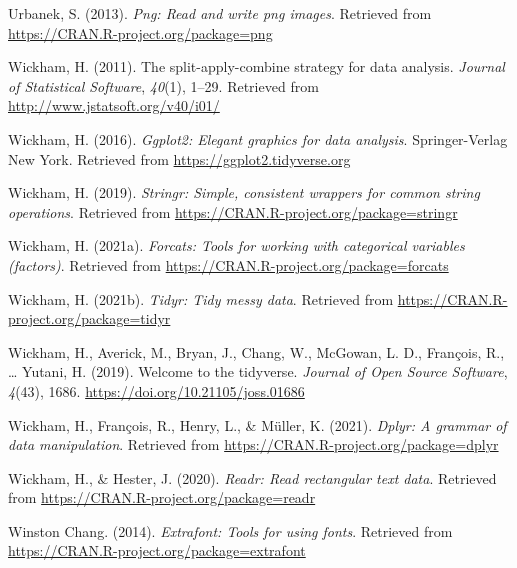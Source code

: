 \documentclass[
  english,
  man,floatsintext]{apa6}
\begin{document}
\leavevmode\hypertarget{ref-R-png}{}%
Urbanek, S. (2013). \emph{Png: Read and write png images}. Retrieved from \url{https://CRAN.R-project.org/package=png}

\leavevmode\hypertarget{ref-R-plyr}{}%
Wickham, H. (2011). The split-apply-combine strategy for data analysis. \emph{Journal of Statistical Software}, \emph{40}(1), 1--29. Retrieved from \url{http://www.jstatsoft.org/v40/i01/}

\leavevmode\hypertarget{ref-R-ggplot2}{}%
Wickham, H. (2016). \emph{Ggplot2: Elegant graphics for data analysis}. Springer-Verlag New York. Retrieved from \url{https://ggplot2.tidyverse.org}

\leavevmode\hypertarget{ref-R-stringr}{}%
Wickham, H. (2019). \emph{Stringr: Simple, consistent wrappers for common string operations}. Retrieved from \url{https://CRAN.R-project.org/package=stringr}

\leavevmode\hypertarget{ref-R-forcats}{}%
Wickham, H. (2021a). \emph{Forcats: Tools for working with categorical variables (factors)}. Retrieved from \url{https://CRAN.R-project.org/package=forcats}

\leavevmode\hypertarget{ref-R-tidyr}{}%
Wickham, H. (2021b). \emph{Tidyr: Tidy messy data}. Retrieved from \url{https://CRAN.R-project.org/package=tidyr}

\leavevmode\hypertarget{ref-R-tidyverse}{}%
Wickham, H., Averick, M., Bryan, J., Chang, W., McGowan, L. D., François, R., \ldots{} Yutani, H. (2019). Welcome to the tidyverse. \emph{Journal of Open Source Software}, \emph{4}(43), 1686. \url{https://doi.org/10.21105/joss.01686}

\leavevmode\hypertarget{ref-R-dplyr}{}%
Wickham, H., François, R., Henry, L., \& Müller, K. (2021). \emph{Dplyr: A grammar of data manipulation}. Retrieved from \url{https://CRAN.R-project.org/package=dplyr}

\leavevmode\hypertarget{ref-R-readr}{}%
Wickham, H., \& Hester, J. (2020). \emph{Readr: Read rectangular text data}. Retrieved from \url{https://CRAN.R-project.org/package=readr}

\leavevmode\hypertarget{ref-R-extrafont}{}%
Winston Chang. (2014). \emph{Extrafont: Tools for using fonts}. Retrieved from \url{https://CRAN.R-project.org/package=extrafont}

\endgroup
\end{document}
